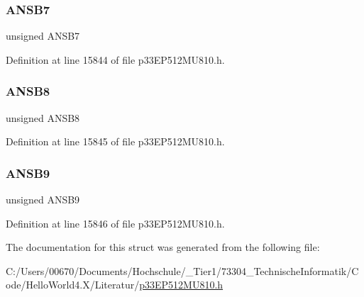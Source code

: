 \subsubsection{\texorpdfstring{A\+N\+S\+B7}{ANSB7}}
{\footnotesize\ttfamily unsigned A\+N\+S\+B7}



Definition at line 15844 of file p33\+E\+P512\+M\+U810.\+h.

\mbox{\label{structtag_a_n_s_e_l_b_b_i_t_s_a517be6a4d6a2726f93c5577d22243fbd}} 
\subsubsection{\texorpdfstring{A\+N\+S\+B8}{ANSB8}}
{\footnotesize\ttfamily unsigned A\+N\+S\+B8}



Definition at line 15845 of file p33\+E\+P512\+M\+U810.\+h.

\mbox{\label{structtag_a_n_s_e_l_b_b_i_t_s_ac9fc58d029b3a833191ee783bf9773a6}} 
\subsubsection{\texorpdfstring{A\+N\+S\+B9}{ANSB9}}
{\footnotesize\ttfamily unsigned A\+N\+S\+B9}



Definition at line 15846 of file p33\+E\+P512\+M\+U810.\+h.



The documentation for this struct was generated from the following file\+:\begin{DoxyCompactItemize}
\item 
C\+:/\+Users/00670/\+Documents/\+Hochschule/\+\_\+\+Tier1/73304\+\_\+\+Technische\+Informatik/\+Code/\+Hello\+World4.\+X/\+Literatur/\hyperlink{p33_e_p512_m_u810_8h}{p33\+E\+P512\+M\+U810.\+h}\end{DoxyCompactItemize}

